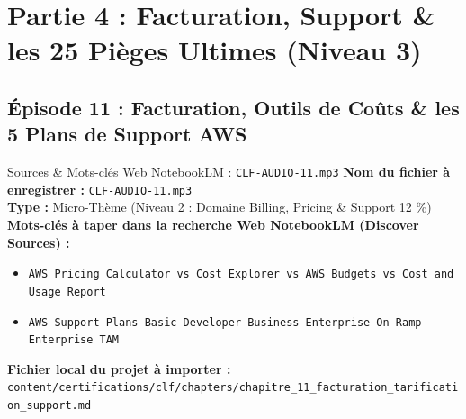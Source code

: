 \documentclass[11pt,a4paper]{article}
\begin{document}
\newpage

\section{Partie 4 : Facturation, Support \& les 25 Pièges Ultimes (Niveau 3)}

\subsection{Épisode 11 : Facturation, Outils de Coûts \& les 5 Plans de Support AWS}
\begin{sourcebox}{Sources \& Mots-clés Web NotebookLM : \texttt{CLF-AUDIO-11.mp3}}
\textbf{Nom du fichier à enregistrer :} \texttt{CLF-AUDIO-11.mp3}\\
\textbf{Type :} Micro-Thème (Niveau 2 : Domaine Billing, Pricing \& Support 12 \%)\\
\textbf{Mots-clés à taper dans la recherche Web NotebookLM (Discover Sources) :}
\begin{itemize}[noitemsep]
    \item \texttt{AWS Pricing Calculator vs Cost Explorer vs AWS Budgets vs Cost and Usage Report}
    \item \texttt{AWS Support Plans Basic Developer Business Enterprise On-Ramp Enterprise TAM}
\end{itemize}
\textbf{Fichier local du projet à importer :}
\texttt{content/certifications/clf/chapters/chapitre_11_facturation_tarification_support.md}
\end{sourcebox}
\end{document}
